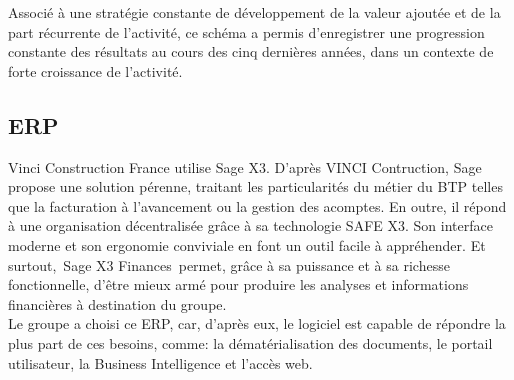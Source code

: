 \documentclass[a4paper]{article}
\begin{document}
Associé à une stratégie constante de développement de la valeur ajoutée et de la part récurrente de l’activité, ce schéma a permis d’enregistrer une progression constante des résultats au cours des cinq dernières années, dans un contexte de forte croissance de l’activité.

\subsection{ERP}

Vinci Construction France utilise Sage X3. D'après VINCI Contruction, Sage propose une solution pérenne, traitant les particularités du métier du BTP telles que la facturation à l’avancement ou la gestion des acomptes. En outre, il répond à une organisation décentralisée grâce à sa technologie SAFE X3. Son interface moderne et son ergonomie conviviale en font un outil facile à appréhender. Et surtout, Sage X3 Finances permet, grâce à sa puissance et à sa richesse fonctionnelle, d’être mieux armé pour produire les analyses et informations financières à destination du groupe. \\

Le groupe a choisi ce ERP, car, d'après eux, le logiciel est capable de répondre la plus part de ces besoins, comme: la dématérialisation des documents, le portail utilisateur, la Business Intelligence et l’accès web.
\end{document}
